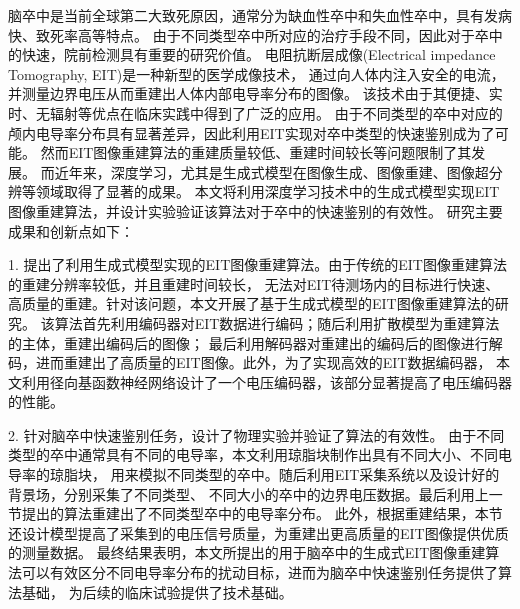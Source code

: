 
\begin{chineseabstract}

    脑卒中是当前全球第二大致死原因，通常分为缺血性卒中和失血性卒中，具有发病快、致死率高等特点。
    由于不同类型卒中所对应的治疗手段不同，因此对于卒中的快速，院前检测具有重要的研究价值。
    电阻抗断层成像(Electrical impedance Tomography, EIT)是一种新型的医学成像技术，
    通过向人体内注入安全的电流，并测量边界电压从而重建出人体内部电导率分布的图像。
    该技术由于其便捷、实时、无辐射等优点在临床实践中得到了广泛的应用。
    由于不同类型的卒中对应的颅内电导率分布具有显著差异，因此利用EIT实现对卒中类型的快速鉴别成为了可能。
    然而EIT图像重建算法的重建质量较低、重建时间较长等问题限制了其发展。
    而近年来，深度学习，尤其是生成式模型在图像生成、图像重建、图像超分辨等领域取得了显著的成果。
    本文将利用深度学习技术中的生成式模型实现EIT图像重建算法，并设计实验验证该算法对于卒中的快速鉴别的有效性。
    研究主要成果和创新点如下：

    1. 提出了利用生成式模型实现的EIT图像重建算法。由于传统的EIT图像重建算法的重建分辨率较低，并且重建时间较长，
    无法对EIT待测场内的目标进行快速、高质量的重建。针对该问题，本文开展了基于生成式模型的EIT图像重建算法的研究。
    该算法首先利用编码器对EIT数据进行编码；随后利用扩散模型为重建算法的主体，重建出编码后的图像；
    最后利用解码器对重建出的编码后的图像进行解码，进而重建出了高质量的EIT图像。此外，为了实现高效的EIT数据编码器，
    本文利用径向基函数神经网络设计了一个电压编码器，该部分显著提高了电压编码器的性能。
 
    2. 针对脑卒中快速鉴别任务，设计了物理实验并验证了算法的有效性。
    由于不同类型的卒中通常具有不同的电导率，本文利用琼脂块制作出具有不同大小、不同电导率的琼脂块，
    用来模拟不同类型的卒中。随后利用EIT采集系统以及设计好的背景场，分别采集了不同类型、
    不同大小的卒中的边界电压数据。最后利用上一节提出的算法重建出了不同类型卒中的电导率分布。
    此外，根据重建结果，本节还设计模型提高了采集到的电压信号质量，为重建出更高质量的EIT图像提供优质的测量数据。
    最终结果表明，本文所提出的用于脑卒中的生成式EIT图像重建算法可以有效区分不同电导率分布的扰动目标，进而为脑卒中快速鉴别任务提供了算法基础，
    为后续的临床试验提供了技术基础。





\end{chineseabstract}

